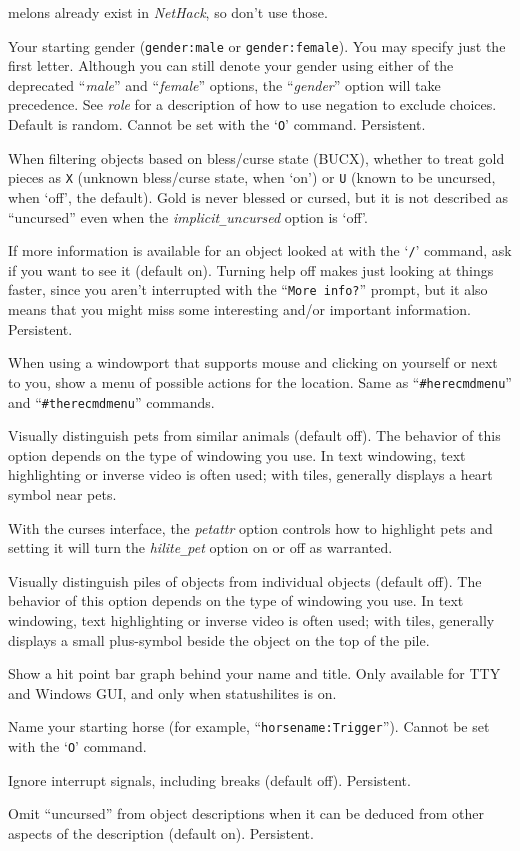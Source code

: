 melons already exist in {\it NetHack\/}, so don't use those.
\item[\ib{gender}]
Your starting gender ({\tt gender:male} or {\tt gender:female}).
You may specify just the first letter.
Although you can
still denote your gender using either of the deprecated
``{\it male\/}'' and ``{\it female\/}''
options, the ``{\it gender\/}'' option will take precedence.
See {\it role\/}
for a description of how to use negation to exclude choices.
\\
Default is random.
Cannot be set with the `{\tt O}' command.  Persistent.
\item[\ib{goldX}]
When filtering objects based on bless/curse state (BUCX), whether to
treat gold pieces as {\tt X} (unknown bless/curse state, when `on')
or {\tt U} (known to be uncursed, when `off', the default).
Gold is never blessed or cursed, but it is not described as ``uncursed''
even when the {\it implicit\verb+_+uncursed\/} option is `off'.
\item[\ib{help}]
If more information is available for an object looked at
with the `{\tt /}' command, ask if you want to see it (default on).
Turning help off makes just looking at things faster, since you aren't
interrupted with the ``{\tt More info?}'' prompt, but it also means that you
might miss some interesting and/or important information.  Persistent.
\item[\ib{herecmd\verb+_+menu}]
When using a windowport that supports mouse and clicking on yourself or
next to you, show a menu of possible actions for the location.
Same as ``{\tt \#herecmdmenu}'' and ``{\tt \#therecmdmenu}'' commands.
\item[\ib{hilite\verb+_+pet}]
Visually distinguish pets from similar animals (default off).
The behavior of this option depends on the type of windowing you use.
In text windowing, text highlighting or inverse video is often used;
with tiles, generally displays a heart symbol near pets.

With the curses interface, the {\it petattr\/}
option controls how to highlight pets and setting it will turn the
{\it hilite\verb+_+pet\/} option on or off as warranted.
\item[\ib{hilite\verb+_+pile}]
Visually distinguish piles of objects from individual objects (default off).
The behavior of this option depends on the type of windowing you use.
In text windowing, text highlighting or inverse video is often used;
with tiles, generally displays a small plus-symbol beside the object
on the top of the pile.
\item[\ib{hitpointbar}]
Show a hit point bar graph behind your name and title.
Only available for TTY and Windows GUI, and only when statushilites is on.
\item[\ib{horsename}]
Name your starting horse (for example, ``{\tt horsename:Trigger}'').
Cannot be set with the `{\tt O}' command.
\item[\ib{ignintr}]
Ignore interrupt signals, including breaks (default off).  Persistent.
\item[\ib{implicit\verb+_+uncursed}]
Omit ``uncursed'' from object descriptions when it can be deduced from
other aspects of the description (default on).
Persistent.

